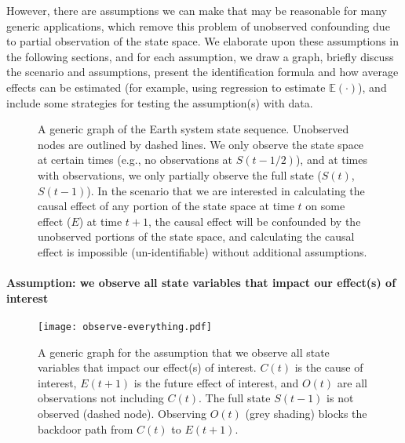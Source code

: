 \documentclass[12pt]{article}
\begin{document}
However, there are assumptions we can make that may be reasonable for
many generic applications, which remove this problem of unobserved
confounding due to partial observation of the state space. We
elaborate upon these assumptions in the following sections, and for
each assumption, we draw a graph, briefly discuss the scenario and
assumptions, present the identification formula and how average
effects can be estimated (for example, using regression to estimate
$\mathbb{E}(\cdot )$), and include some strategies for testing the
assumption(s) with data.

\begin{figure}
  \centering
  
  \caption{A generic graph of the Earth system state
    sequence. Unobserved nodes are outlined by dashed lines. We only
    observe the state space at certain times (e.g., no observations at
    $S(t-1/2)$), and at times with observations, we only partially
    observe the full state ($S(t)$, $S(t-1)$). In the scenario that we
    are interested in calculating the causal effect of any portion of
    the state space at time $t$ on some effect ($E$) at time $t+1$,
    the causal effect will be confounded by the unobserved portions of
    the state space, and calculating the causal effect is impossible
    (un-identifiable) without additional assumptions.}
  \label{fig:generic}
\end{figure}

\newpage

\paragraph{Assumption: we observe all state variables that impact our effect(s) of interest}

\begin{figure}[H]
  \centering
  \texttt{[image: observe-everything.pdf]}
  \caption{A generic graph for the assumption that we observe all
    state variables that impact our effect(s) of interest. $C(t)$ is
    the cause of interest, $E(t+1)$ is the future effect of interest,
    and $O(t)$ are all observations not including $C(t)$. The full
    state $S(t-1)$ is not observed (dashed node). Observing $O(t)$
    (grey shading) blocks the backdoor path from $C(t)$ to $E(t+1)$.}
  \label{fig:observe-everything}
\end{figure}
\end{document}
